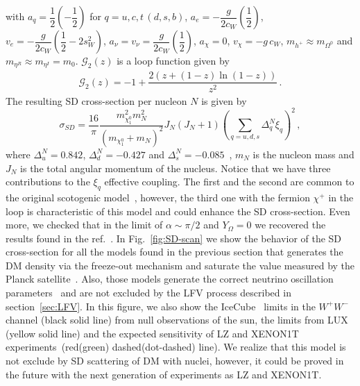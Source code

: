 \documentclass[12pt,letterpaper]{article}
\begin{document}
%
with $a_q = \dfrac{1}{2} \left(-\dfrac{1}{2}\right)$ for $q=u,c,t\, (d,s,b)$, $a_{e} = -\dfrac{g}{2c_W}\left(\dfrac{1}{2}\right)$, $v_{e} = -\dfrac{g}{2c_W}\left(\dfrac{1}{2}-2s^2_W \right)$, $a_\nu = v_\nu = \dfrac{g}{2c_W}\left(\dfrac{1}{2}\right)$, $a_{\chi} = 0$, $v_{\chi} = -g\, c_W$, $m_{h^+}\approx m_{\Omega^0}$ and $ m_{\eta^R}\approx m_{\eta^I}=m_0$. $\mathcal{G}_2(z)$ is a loop function given by
%
\begin{align}
\label{eq:G2}
\mathcal{G}_2(z) = -1 + \dfrac{2(z+(1-z)\ln(1-z))}{z^2}\,.
\end{align}
%
The resulting SD cross-section per nucleon  $N$  is given by
%
\begin{equation}
\label{eq:SD}
\sigma_{SD}=\dfrac{16}{\pi}\dfrac{m_{\chi^0_1}^2m_N^2}{(m_{\chi^0_1}+m_N)^2}J_N(J_N+1)\left(\sum_{q=u,d,s}\Delta_q^N \xi_q\right)^2 \,,
\end{equation}
where $\Delta_u^N=0.842$, $\Delta_d^N= -0.427$ and $\Delta_s^N= -0.085$~\cite{Airapetian:2006vy}, $m_N$ is the nucleon mass and $J_N$ is the  total angular momentum of the nucleus. 
Notice that we have three contributions to the $\xi_q$ effective coupling. 
The first and the second are common to the original scotogenic model~\cite{Ma:2006km}, however, the third one with the fermion $\chi^{+}$ in the loop is characteristic of this model and could enhance the SD cross-section. Even more, we checked that in the limit of $\alpha\sim\pi/2$ and $Y_{\Omega}=0$ we recovered the results found in the ref.~\cite{Ibarra:2016dlb}.
In Fig.~\ref{fig:SD-scan} we show the behavior of the SD cross-section for all the models found in the previous section that generates the DM density via the freeze-out mechanism and saturate the value measured by the Planck satellite~\cite{Aghanim:2018eyx}. Also, those models generate the correct neutrino oscillation parameters~\cite{deSalas:2017kay} and are not excluded by the LFV process described in section~\ref{sec:LFV}. 
In this figure, we also show the IceCube~\cite{2013PhRvL.110m1302A} limits in the $W^+W^-$ channel (black solid line) from null observations of the sun, the limits from LUX~\cite{Akerib:2016lao} (yellow solid line) and the expected sensitivity of LZ and XENON1T experiments~\cite{Cushman:2013zza}(red(green) dashed(dot-dashed) line).
We realize that this model is not exclude by SD scattering of DM with nuclei, however, it could be proved in the future with the next generation of experiments as LZ and XENON1T.
%
\end{document}
